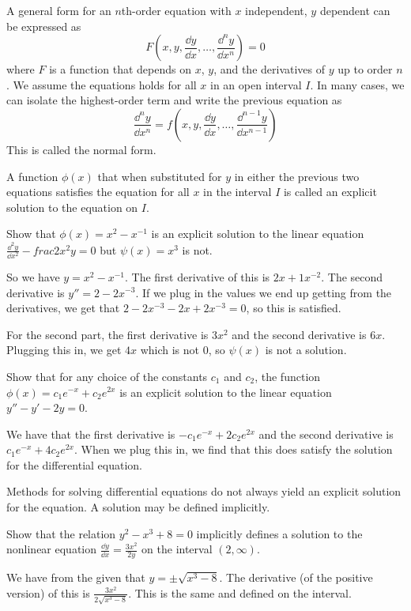 \documentclass[../diffeq.tex]{subfiles}
\begin{document}
A general form for an $n$th-order equation with $x$ independent, $y$ dependent can be expressed as 
\[ F(x,y,\frac{\dd y}{\dd x},\dots,\frac{\dd^n y}{\dd x^n})=0 \]
where $F$ is a function that depends on $x$, $y$, and the derivatives of $y$ up to order $n$. We assume the equations holds for all $x$ in an open interval $I$. In many cases, we can isolate the highest-order term and write the previous equation as 
\[ \frac{\dd^n y}{\dd x^n} = f\left(x,y,\frac{\dd y}{\dd x},\dots,\frac{\dd^{n-1}y}{\dd x^{n-1}}\right)\]
This is called the normal form.

A function $\phi(x)$ that when substituted for $y$ in either the previous two equations satisfies the equation for all $x$ in the interval $I$ is called an explicit solution to the equation on $I$.

\begin{example}
    Show that $\phi(x)=x^2-x^{-1}$ is an explicit solution to the linear equation $\frac{\dd^2 y}{\dd x^2}-frac{2}{x^2}y=0$ but $\psi(x)=x^3$ is not.

    So we have $y=x^2-x^{-1}$. The first derivative of this is $2x+1x^{-2}$. The second derivative is $y'' = 2-2x^{-3}$. If we plug in the values we end up getting from the derivatives, we get that 
    $2-2x^{-3}-2x+2x^{-3} = 0$, so this is satisfied.

    For the second part, the first derivative is $3x^2$ and the second derivative is $6x$. Plugging this in, we get $4x$ which is not $0$, so $\psi(x)$ is not a solution.
\end{example}

\begin{example}
    Show that for any choice of the constants $c_1$ and $c_2$, the function $\phi(x)=c_1e^{-x}+c_2e^{2x}$ is an explicit solution to the linear equation $y''-y'-2y=0$.

    We have that the first derivative is $-c_1e^{-x}+2c_2e^{2x}$ and the second derivative is $c_1e^{-x} + 4c_2e^{2x}$. When we plug this in, we find that this does satisfy the solution for the differential equation.
\end{example}

Methods for solving differential equations do not always yield an explicit solution for the equation. A solution may be defined implicitly.

\begin{example}
    Show that the relation $y^2-x^3+8=0$ implicitly defines a solution to the nonlinear equation $\frac{\dd y}{\dd x}=\frac{3x^2}{2y}$ on the interval $(2,\infty)$.

    We have from the given that $y=\pm\sqrt{x^3-8}$. The derivative (of the positive version) of this is $\frac{3x^2}{2\sqrt{x^3-8}}$. This is the same and defined on the interval.
\end{example}
\end{document}
